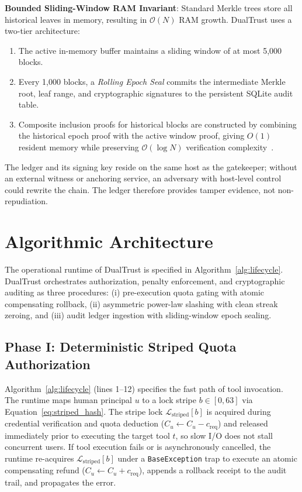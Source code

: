 \documentclass[journal]{IEEEtran}
\begin{document}
\textbf{Bounded Sliding-Window RAM Invariant}: Standard Merkle trees store all historical leaves in memory, resulting in $\mathcal{O}(N)$ RAM growth. DualTrust uses a two-tier architecture:
\begin{enumerate}[leftmargin=12pt, topsep=2pt, itemsep=1pt]
\item The active in-memory buffer maintains a sliding window of at most 5,000 blocks.
\item Every 1,000 blocks, a \emph{Rolling Epoch Seal} commits the intermediate Merkle root, leaf range, and cryptographic signatures to the persistent SQLite audit table.
\item Composite inclusion proofs for historical blocks are constructed by combining the historical epoch proof with the active window proof, giving $O(1)$ resident memory while preserving $\mathcal{O}(\log N)$ verification complexity~\cite{melara2015coniks}.
\end{enumerate}
The ledger and its signing key reside on the same host as the gatekeeper; without an external witness or anchoring service, an adversary with host-level control could rewrite the chain. The ledger therefore provides tamper evidence, not non-repudiation.

\section{Algorithmic Architecture}
\label{sec:algorithms}

The operational runtime of DualTrust is specified in Algorithm~\ref{alg:lifecycle}. DualTrust orchestrates authorization, penalty enforcement, and cryptographic auditing as three procedures: (i) pre-execution quota gating with atomic compensating rollback, (ii) asymmetric power-law slashing with clean streak zeroing, and (iii) audit ledger ingestion with sliding-window epoch sealing.

\subsection{Phase I: Deterministic Striped Quota Authorization}
Algorithm~\ref{alg:lifecycle} (lines 1--12) specifies the fast path of tool invocation. The runtime maps human principal $u$ to a lock stripe $b \in [0, 63]$ via Equation~\eqref{eq:striped_hash}. The stripe lock $\mathcal{L}_{\text{striped}}[b]$ is acquired during credential verification and quota deduction ($C_u \leftarrow C_u - c_{\text{req}}$) and released immediately prior to executing the target tool $t$, so slow I/O does not stall concurrent users. If tool execution fails or is asynchronously cancelled, the runtime re-acquires $\mathcal{L}_{\text{striped}}[b]$ under a \texttt{BaseException} trap to execute an atomic compensating refund ($C_u \leftarrow C_u + c_{\text{req}}$), appends a rollback receipt to the audit trail, and propagates the error.
\end{document}
